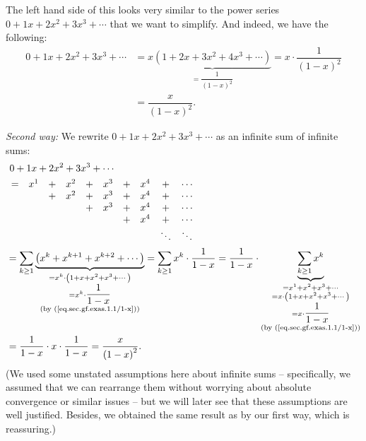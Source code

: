 The left hand side of this looks very similar to the power series
$0+1x+2x^{2}+3x^{3}+\cdots$ that we want to simplify. And indeed, we have the
following:%
\begin{align}
0+1x+2x^{2}+3x^{3}+\cdots &  =x\underbrace{\left(  1+2x+3x^{2}+4x^{3}%
+\cdots\right)  }_{=\dfrac{1}{\left(  1-x\right)  ^{2}}}=x\cdot\dfrac
{1}{\left(  1-x\right)  ^{2}}\nonumber\\
&  =\dfrac{x}{\left(  1-x\right)  ^{2}}. \label{eq.sec.gf.exas.4.x/(1-x)2}%
\end{align}
\medskip

\textit{Second way:} We rewrite $0+1x+2x^{2}+3x^{3}+\cdots$ as an infinite sum
of infinite sums:%
\begin{align}
&  \ 0+1x+2x^{2}+3x^{3}+\cdots\nonumber\\
&
\begin{array}
[c]{cccccccccc}%
= & x^{1} & + & x^{2} & + & x^{3} & + & x^{4} & + & \cdots\\
&  & + & x^{2} & + & x^{3} & + & x^{4} & + & \cdots\\
&  &  &  & + & x^{3} & + & x^{4} & + & \cdots\\
&  &  &  &  &  & + & x^{4} & + & \cdots\\
&  &  &  &  &  &  &  & \ddots & \ddots
\end{array}
\nonumber\\
&  =\sum_{k\geq1}\underbrace{\left(  x^{k}+x^{k+1}+x^{k+2}+\cdots\right)
}_{\substack{=x^{k}\cdot\left(  1+x+x^{2}+x^{3}+\cdots\right)  \\=x^{k}%
\cdot\dfrac{1}{1-x}\\\text{(by (\ref{eq.sec.gf.exas.1.1/1-x}))}}}=\sum
_{k\geq1}x^{k}\cdot\dfrac{1}{1-x}=\dfrac{1}{1-x}\cdot\underbrace{\sum_{k\geq
1}x^{k}}_{\substack{=x^{1}+x^{2}+x^{3}+\cdots\\=x\cdot\left(  1+x+x^{2}%
+x^{3}+\cdots\right)  \\=x\cdot\dfrac{1}{1-x}\\\text{(by
(\ref{eq.sec.gf.exas.1.1/1-x}))}}}\nonumber\\
&  =\dfrac{1}{1-x}\cdot x\cdot\dfrac{1}{1-x}=\dfrac{x}{\left(  1-x\right)
^{2}}. \label{eq.sec.gf.exas.4.x/(1-x)2alt}%
\end{align}
(We used some unstated assumptions here about infinite sums -- specifically,
we assumed that we can rearrange them without worrying about absolute
convergence or similar issues -- but we will later see that these assumptions
are well justified. Besides, we obtained the same result as by our first way,
which is reassuring.) \medskip

